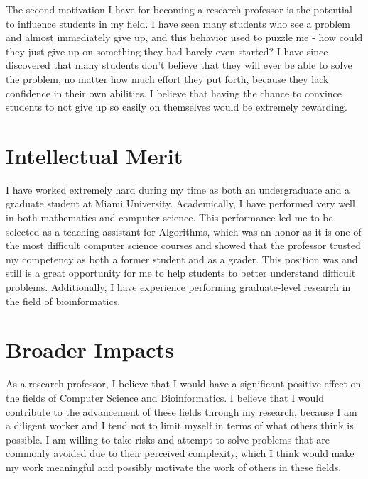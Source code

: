 \documentclass[12pt]{article}
\begin{document}
The second motivation I have for becoming a research professor is the potential to influence students in my field.
I have seen many students who see a problem and almost immediately give up, and this behavior used to puzzle me - how could they just give up on something they had barely even started?
I have since discovered that many students don't believe that they will ever be able to solve the problem, no matter how much effort they put forth, because they lack confidence in their own abilities.
I believe that having the chance to convince students to not give up so easily on themselves would be extremely rewarding.

\section*{Intellectual Merit}
I have worked extremely hard during my time as both an undergraduate and a graduate student at Miami University. 
Academically, I have performed very well in both mathematics and computer science. 
This performance led me to be selected as a teaching assistant for Algorithms, which was an honor as it is one of the most difficult computer science courses and showed that the professor trusted my competency as both a former student and as a grader.
This position was and still is a great opportunity for me to help students to better understand difficult problems.
Additionally, I have experience performing graduate-level research in the field of bioinformatics. 

\section*{Broader Impacts}
As a research professor, I believe that I would have a significant positive effect on the fields of Computer Science and Bioinformatics.
I believe that I would contribute to the advancement of these fields through my research, because I am a diligent worker and I tend not to limit myself in terms of what others think is possible.
I am willing to take risks and attempt to solve problems that are commonly avoided due to their perceived complexity, which I think would make my work meaningful and possibly motivate the work of others in these fields.
\end{document}
